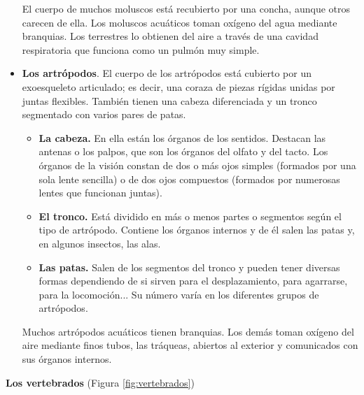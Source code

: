 \begin{itemize}
    El cuerpo de muchos moluscos está recubierto por una concha, aunque otros carecen de ella. Los moluscos acuáticos toman oxígeno del agua mediante branquias. Los terrestres lo obtienen del aire a través de una cavidad respiratoria que funciona como un pulmón muy simple.
    \item \textbf{Los artrópodos}. El cuerpo de los artrópodos está cubierto por un exoesqueleto articulado; es decir, una coraza de piezas rígidas unidas por juntas flexibles. También tienen una cabeza diferenciada y un tronco segmentado con varios pares de patas.
    \begin{itemize}
        \item \textbf{La cabeza.} En ella están los órganos de los sentidos. Destacan las antenas o los palpos, que son los órganos del olfato y del tacto. Los órganos de la visión constan de dos o más ojos simples (formados por una sola lente sencilla) o de dos ojos compuestos (formados por numerosas lentes que funcionan juntas).
        \item \textbf{El tronco.} Está dividido en más o menos partes o segmentos según el tipo de artrópodo. Contiene los órganos internos y de él salen las patas y, en algunos insectos, las alas.
        \item \textbf{Las patas.} Salen de los segmentos del tronco y pueden tener diversas formas dependiendo de si sirven para el desplazamiento, para agarrarse, para la locomoción... Su número varía en los diferentes grupos de artrópodos.
    \end{itemize}
    Muchos artrópodos acuáticos tienen branquias. Los demás toman oxígeno del aire mediante finos tubos, las tráqueas, abiertos al exterior y comunicados con sus órganos internos.
\end{itemize}

\vspace{3mm}
\textbf{Los vertebrados} (Figura \ref{fig:vertebrados})

